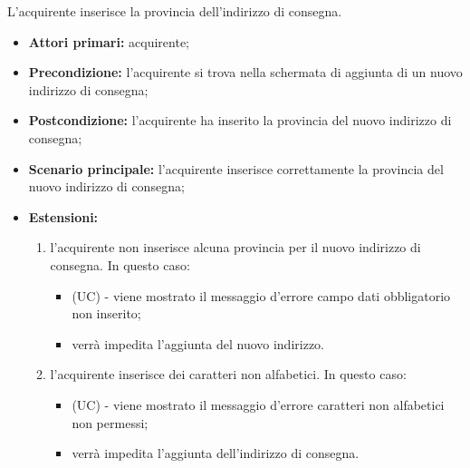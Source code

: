 L'acquirente inserisce la provincia dell'indirizzo di consegna.
\begin{itemize}
    \item \textbf{Attori primari:} acquirente;
    \item \textbf{Precondizione:} l'acquirente si trova nella schermata di aggiunta di un nuovo indirizzo di consegna;
    \item \textbf{Postcondizione:} l'acquirente ha inserito la provincia del nuovo indirizzo di consegna;
    \item \textbf{Scenario principale:} l'acquirente inserisce correttamente la provincia del nuovo indirizzo di consegna;
    \item \textbf{Estensioni:}
    \begin{enumerate}[label=\lett]
        \item l'acquirente non inserisce alcuna provincia per il nuovo indirizzo di consegna. In questo caso:
        \begin{itemize}
            \item (UC) - viene mostrato il messaggio d'errore campo dati obbligatorio non inserito;
            \item verrà impedita l'aggiunta del nuovo indirizzo.
        \end{itemize}
        \item l'acquirente inserisce dei caratteri non alfabetici. In questo caso:
        \begin{itemize}
            \item (UC) - viene mostrato il messaggio d'errore caratteri non alfabetici non permessi;
            \item verrà impedita l'aggiunta dell'indirizzo di consegna.
        \end{itemize}
    \end{enumerate}
\end{itemize}

